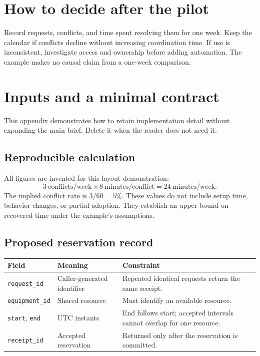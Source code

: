 \documentclass[11pt,letterpaper]{article}
\begin{document}
\section*{How to decide after the pilot}
Record requests, conflicts, and time spent resolving them for one week.
Keep the calendar if conflicts decline without increasing coordination
time. If use is inconsistent, investigate access and ownership before
adding automation. The example makes no causal claim from a one-week comparison.

\clearpage
\appendix
\section{Inputs and a minimal contract}\label{app:inputs}
This appendix demonstrates how to retain implementation detail without
expanding the main brief. Delete it when the reader does not need it.

\subsection*{Reproducible calculation}
All figures are invented for this layout demonstration:
\[
  3\ \mbox{conflicts/week}\times8\ \mbox{minutes/conflict}
  =24\ \mbox{minutes/week}.
\]
The implied conflict rate is $3/60=5\%$. These values do not include
setup time, behavior changes, or partial adoption. They establish an
upper bound on recovered time under the example's assumptions.

\subsection*{Proposed reservation record}
\begin{tabularx}{\linewidth}{@{}lYY@{}}
\toprule
\textbf{Field} & \textbf{Meaning} & \textbf{Constraint}\\
\midrule
\texttt{request\_id} & Caller-generated identifier & Repeated identical requests return the same receipt.\\
\texttt{equipment\_id} & Shared resource & Must identify an available resource.\\
\texttt{start}, \texttt{end} & UTC instants & End follows start; accepted intervals cannot overlap for one resource.\\
\texttt{receipt\_id} & Accepted reservation & Returned only after the reservation is committed.\\
\bottomrule
\end{tabularx}
\par\vspace{4pt}
\end{document}
